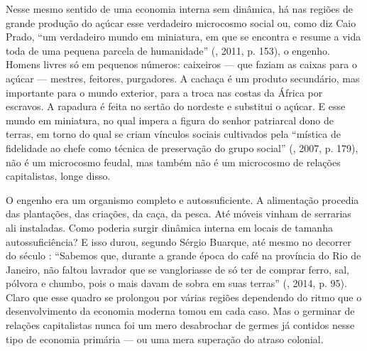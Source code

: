 Nesse mesmo sentido de uma economia interna sem dinâmica, há nas regiões
de grande produção do açúcar esse verdadeiro microcosmo social ou, como
diz Caio Prado, ``um verdadeiro mundo em miniatura, em que se encontra e
resume a vida toda de uma pequena parcela de humanidade'' (,
2011, p. 153), o engenho. Homens livres só em pequenos números:
caixeiros --- que faziam as caixas para o açúcar --- mestres, feitores,
purgadores. A cachaça é um produto secundário, mas importante para o
mundo exterior, para a troca nas costas da África por escravos. A
rapadura é feita no sertão do nordeste e substitui o açúcar. E esse
mundo em miniatura, no qual impera a figura do senhor patriarcal dono de
terras, em torno do qual se criam vínculos sociais cultivados pela
``mística de fidelidade ao chefe como técnica de preservação do grupo
social'' (, 2007, p. 179), não é um microcosmo feudal, mas também
não é um microcosmo de relações capitalistas, longe disso.

O engenho era um organismo completo e autossuficiente. A alimentação
procedia das plantações, das criações, da caça, da pesca. Até móveis
vinham de serrarias ali instaladas. Como poderia surgir dinâmica interna
em locais de tamanha autossuficiência? E isso durou, segundo Sérgio
Buarque, até mesmo no decorrer do século : ``Sabemos que, durante a
grande época do café na província do Rio de Janeiro, não faltou lavrador
que se vangloriasse de só ter de comprar ferro, sal, pólvora e chumbo,
pois o mais davam de sobra em suas terras'' (, 2014, p. 95).
Claro que esse quadro se prolongou por várias regiões dependendo do
ritmo que o desenvolvimento da economia moderna tomou em cada caso. Mas
o germinar de relações capitalistas nunca foi um mero desabrochar de
germes já contidos nesse tipo de economia primária --- ou uma mera
superação do atraso colonial.

